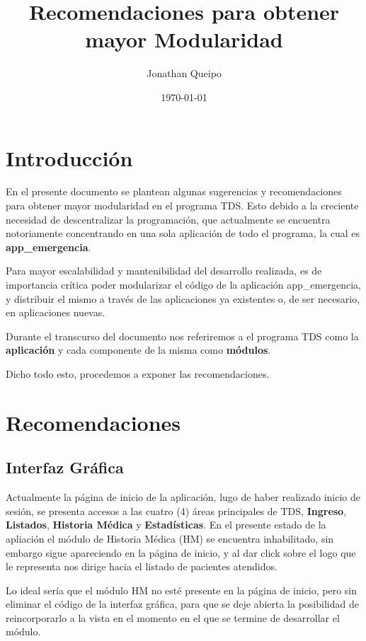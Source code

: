 \documentclass[9pt, letterpaper, oneside]{report}
\title{Recomendaciones para obtener mayor Modularidad}
\author{Jonathan Queipo}
\date{\today}
\begin{document}
\maketitle

\newpage

\tableofcontents

\newpage

\chapter{Introducción}

  En el presente documento se plantean algunas sugerencias y recomendaciones para obtener
  mayor modularidad en el programa TDS. Esto debido a la creciente necesidad de
  descentralizar la programación, que actualmente se encuentra notoriamente concentrando
  en una sola aplicación de todo el programa, la cual es \textbf{app\_emergencia}.
  
  Para mayor escalabilidad y mantenibilidad del desarrollo realizada, es de importancia
  crítica poder modularizar el código de la aplicación app\_emergencia, y distribuir el
  mismo a través de las aplicaciones ya existentes o, de ser necesario, en aplicaciones
  nuevas.
  
  Durante el transcurso del documento nos referiremos a el programa TDS como 
  la \textbf{aplicación} y cada componente de la misma como \textbf{módulos}.
  
  Dicho todo esto, procedemos a exponer las recomendaciones.
  

\chapter{Recomendaciones}

  \section{Interfaz Gráfica}
    Actualmente la página de inicio de la aplicación, lugo de haber realizado
    inicio de sesión, se presenta accesos a las
    cuatro (4) áreas principales de TDS, \textbf{Ingreso}, \textbf{Listados},
    \textbf{Historia Médica} y \textbf{Estadísticas}. En el presente estado de
    la apliación el módulo de Historia Médica (HM) se encuentra inhabilitado, sin
    embargo sigue apareciendo en la página de inicio, y al dar click sobre el
    logo que le representa nos dirige hacia el listado de pacientes atendidos.
    
    Lo ideal sería que el módulo HM no esté presente en la página de inicio, pero
    sin eliminar el código de la interfaz gráfica, para que se deje abierta la
    posibilidad de reincorporarlo a la vista en el momento en el que se termine
    de desarrollar el módulo.
    
\end{document}
